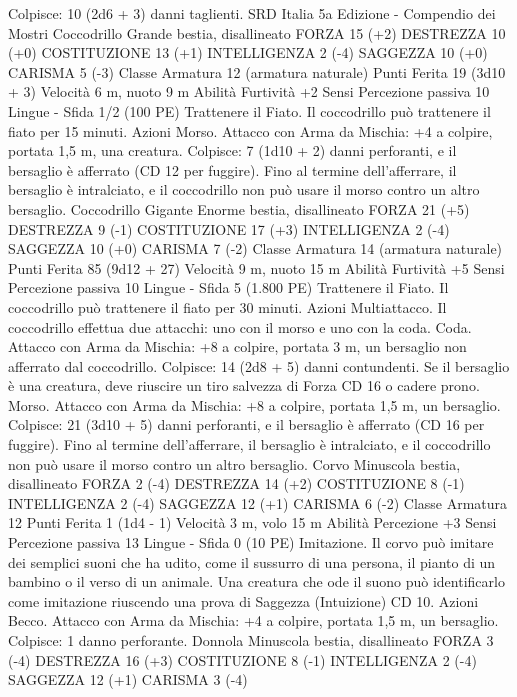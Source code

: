 \begin{multicols}{2}
Colpisce: 10 (2d6 + 3) danni taglienti.
SRD Italia 5a Edizione - Compendio dei Mostri
Coccodrillo
Grande bestia, disallineato
FORZA 15 (+2)
DESTREZZA 10 (+0)
COSTITUZIONE 13 (+1)
INTELLIGENZA 2 (-4)
SAGGEZZA 10 (+0)
CARISMA 5 (-3)
Classe Armatura 12 (armatura naturale)
Punti Ferita 19 (3d10 + 3)
Velocità 6 m, nuoto 9 m
Abilità Furtività +2
Sensi Percezione passiva 10
Lingue -
Sfida 1/2 (100 PE)
Trattenere il Fiato. Il coccodrillo può trattenere il fiato per 15
minuti.
Azioni
Morso. Attacco con Arma da Mischia: +4 a colpire, portata 1,5
m, una creatura.
Colpisce: 7 (1d10 + 2) danni perforanti, e il bersaglio è afferrato
(CD 12 per fuggire). Fino al termine dell’afferrare, il bersaglio è
intralciato, e il coccodrillo non può usare il morso contro un altro
bersaglio.
Coccodrillo Gigante
Enorme bestia, disallineato
FORZA 21 (+5)
DESTREZZA 9 (-1)
COSTITUZIONE 17 (+3)
INTELLIGENZA 2 (-4)
SAGGEZZA 10 (+0)
CARISMA 7 (-2)
Classe Armatura 14 (armatura naturale)
Punti Ferita 85 (9d12 + 27)
Velocità 9 m, nuoto 15 m
Abilità Furtività +5
Sensi Percezione passiva 10
Lingue -
Sfida 5 (1.800 PE)
Trattenere il Fiato. Il coccodrillo può trattenere il fiato per 30
minuti.
Azioni
Multiattacco. Il coccodrillo effettua due attacchi: uno con il
morso e uno con la coda.
Coda. Attacco con Arma da Mischia: +8 a colpire, portata 3 m,
un bersaglio non afferrato dal coccodrillo.
Colpisce: 14 (2d8 + 5) danni contundenti. Se il bersaglio è una
creatura, deve riuscire un tiro salvezza di Forza CD 16 o cadere
prono.
Morso. Attacco con Arma da Mischia: +8 a colpire, portata 1,5
m, un bersaglio.
Colpisce: 21 (3d10 + 5) danni perforanti, e il bersaglio è
afferrato (CD 16 per fuggire). Fino al termine dell’afferrare, il
bersaglio è intralciato, e il coccodrillo non può usare il morso
contro un altro bersaglio.
Corvo
Minuscola bestia, disallineato
FORZA 2 (-4)
DESTREZZA 14 (+2)
COSTITUZIONE 8 (-1)
INTELLIGENZA 2 (-4)
SAGGEZZA 12 (+1)
CARISMA 6 (-2)
Classe Armatura 12
Punti Ferita 1 (1d4 - 1)
Velocità 3 m, volo 15 m
Abilità Percezione +3
Sensi Percezione passiva 13
Lingue -
Sfida 0 (10 PE)
Imitazione. Il corvo può imitare dei semplici suoni che ha udito,
come il sussurro di una persona, il pianto di un bambino o il
verso di un animale. Una creatura che ode il suono può
identificarlo come imitazione riuscendo una prova di Saggezza
(Intuizione) CD 10.
Azioni
Becco. Attacco con Arma da Mischia: +4 a colpire, portata 1,5
m, un bersaglio.
Colpisce: 1 danno perforante.
Donnola
Minuscola bestia, disallineato
FORZA 3 (-4)
DESTREZZA 16 (+3)
COSTITUZIONE 8 (-1)
INTELLIGENZA 2 (-4)
SAGGEZZA 12 (+1)
CARISMA 3 (-4)

\end{multicols}
